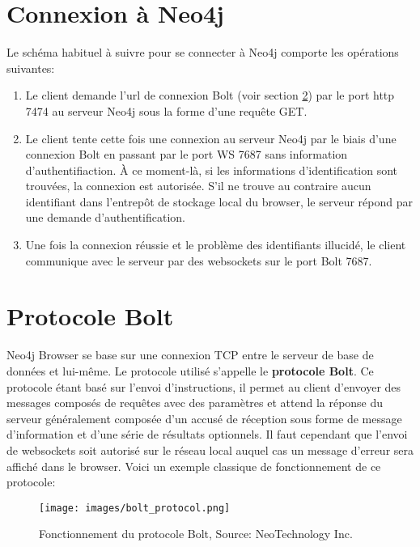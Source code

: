 \documentclass[12pt,twoside, openright]{memoir}
\begin{document}
	\section{Connexion à Neo4j}
	Le schéma habituel à suivre pour se connecter à Neo4j comporte les opérations suivantes:
	\begin{enumerate}
		\item Le client demande l'\gls{url} de connexion Bolt (voir section \ref{sec_bolt}) par le port \gls{http} 7474 au serveur Neo4j sous la forme d'une requête GET.
		\item Le client tente cette fois une connexion au serveur Neo4j par le biais d'une connexion Bolt en passant par le port WS 7687 sans information d'authentifiaction. À ce moment-là, si les informations d'identification sont trouvées, la connexion est autorisée. S'il ne trouve au contraire aucun identifiant dans l'entrepôt de stockage local du browser, le serveur répond par une demande d'authentification.
		\item Une fois la connexion réussie et le problème des identifiants illucidé, le client communique avec le serveur par des websockets sur le port Bolt 7687.
	\end{enumerate}
	\section{Protocole Bolt}
	\label{sec_bolt}
	Neo4j Browser se base sur une connexion TCP entre le serveur de base de données et lui-même. Le protocole utilisé s'appelle le \textbf{protocole Bolt}. Ce protocole étant basé sur l'envoi d'instructions, il permet au client d'envoyer des messages composés de requêtes avec des paramètres et attend la réponse du serveur généralement composée d'un accusé de réception sous forme de message d'information et d'une série de résultats optionnels. Il faut cependant que l'envoi de websockets soit autorisé sur le réseau local auquel cas un message d'erreur sera affiché dans le browser. Voici un exemple classique de fonctionnement de ce protocole:
	\begin{figure}[!ht]
		\center
		\texttt{[image: images/bolt\_protocol.png]}
		\caption{Fonctionnement du protocole Bolt, Source: NeoTechnology Inc.}
	\end{figure}
\end{document}
